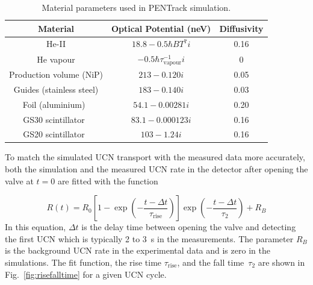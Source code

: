 

\begin{table}
  \centering
  \begin{tabular}{|c|c|c|}
    \hline
    Material & Optical Potential (neV) & Diffusivity \\
    \hline
    He-II  & $18.8 - 0.5\hbar B T^7 i$ & 0.16 \\
    He vapour & $-0.5 \hbar \tau^{-1}_\mathrm{vapour} i$ & 0 \\
    Production volume (NiP) & $213 - 0.120 i$ & 0.05 \\
    Guides (stainless steel) & $183 - 0.140 i$ & 0.03 \\
    Foil (aluminium)~\cite{atchison2009transmission} & $54.1 - 0.00281 i$ & 0.20 \\
    GS30 scintillator~\cite{Ban2016} & $83.1 - 0.000123 i$ & 0.16 \\
    GS20 scintillator~\cite{Ban2016} & $103 - 1.24 i$ & 0.16 \\
    \hline
  \end{tabular}
  \caption{Material parameters used in PENTrack
    simulation.}
  \label{tab:materials}
\end{table}

To match the simulated UCN transport with the measured data more
accurately, both the simulation and the measured UCN rate in the
detector after opening the valve at $t=0$ are fitted with the function

\begin{equation}
R(t) = R_0 \left[ 1 - \exp \left( -\frac{t - \Delta t}{\tau_\mathrm{rise}} \right) \right] \exp \left( -\frac{t - \Delta t}{\tau_2} \right) + R_B
\end{equation}
In this equation, $\Delta t$ is the delay time between opening the
valve and detecting the first UCN which is typically 2 to 3~s in the
measurements. The parameter $R_B$ is the background UCN rate in the
experimental data and is zero in the simulations. The fit function,
the rise time $\tau_{\mathrm{rise}}$, and the fall time~$\tau_2$ are
shown in Fig.~\ref{fig:risefalltime} for a given UCN cycle.

